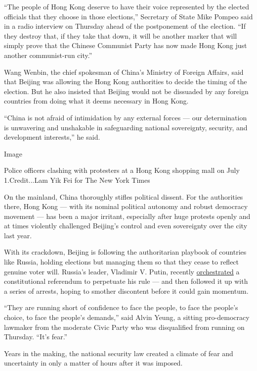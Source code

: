 ``The people of Hong Kong deserve to have their voice represented by the
elected officials that they choose in those elections,'' Secretary of
State Mike Pompeo said in a radio interview on Thursday ahead of the
postponement of the election. ``If they destroy that, if they take that
down, it will be another marker that will simply prove that the Chinese
Communist Party has now made Hong Kong just another communist-run
city.''

Wang Wenbin, the chief spokesman of China's Ministry of Foreign Affairs,
said that Beijing was allowing the Hong Kong authorities to decide the
timing of the election. But he also insisted that Beijing would not be
dissuaded by any foreign countries from doing what it deems necessary in
Hong Kong.

``China is not afraid of intimidation by any external forces --- our
determination is unwavering and unshakable in safeguarding national
sovereignty, security, and development interests,'' he said.

Image

Police officers clashing with protesters at a Hong Kong shopping mall on
July 1.Credit...Lam Yik Fei for The New York Times

On the mainland, China thoroughly stifles political dissent. For the
authorities there, Hong Kong --- with its nominal political autonomy and
robust democracy movement --- has been a major irritant, especially
after huge protests openly and at times violently challenged Beijing's
control and even sovereignty over the city last year.

With its crackdown, Beijing is following the authoritarian playbook of
countries like Russia, holding elections but managing them so that they
cease to reflect genuine voter will. Russia's leader, Vladimir V. Putin,
recently
\href{https://www.nytimes3xbfgragh.onion/2020/07/01/world/europe/putin-referendum-vote-russia.html}{orchestrated}
a constitutional referendum to perpetuate his rule --- and then followed
it up with a series of arrests, hoping to smother discontent before it
could gain momentum.

``They are running short of confidence to face the people, to face the
people's choice, to face the people's demands,'' said Alvin Yeung, a
sitting pro-democracy lawmaker from the moderate Civic Party who was
disqualified from running on Thursday. ``It's fear.''

Years in the making, the national security law created a climate of fear
and uncertainty in only a matter of hours after it was imposed.

